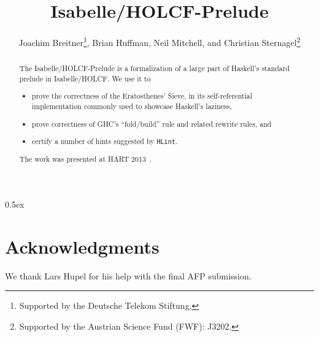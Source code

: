 \documentclass[11pt,a4paper]{article}
\newcommand\hlint{\texttt{HLint}\xspace}
\begin{document}
\title{Isabelle/HOLCF-Prelude}
\author{%
  Joachim Breitner\thanks{Supported by the Deutsche Telekom Stiftung.},
  Brian Huffman,
  Neil Mitchell,
  and
  Christian Sternagel\thanks{Supported by the Austrian Science Fund (FWF): J3202.}}
\maketitle

\begin{abstract}
The Isabelle/HOLCF-Prelude is a formalization of a large part of Haskell's
standard prelude \cite{haskell-prelude} in Isabelle/HOLCF. We use it to
\begin{itemize}
\item prove the correctness of the Eratosthenes' Sieve, in its self-referential implementation commonly used to showcase Haskell's laziness,
\item prove correctness of GHC's ``fold/build'' rule and related rewrite rules, and
\item certify a number of hints suggested by \hlint.
\end{itemize}
The work was presented at HART 2013~\cite{hart2013}.
\end{abstract}

\tableofcontents


\parindent 0pt\parskip 0.5ex



\section*{Acknowledgments}

We thank Lars Hupel for his help with the final AFP submission.



\end{document}
